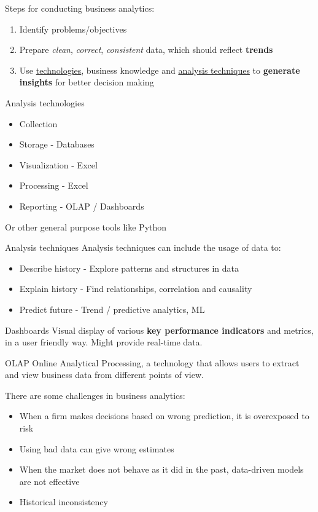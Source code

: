 Steps for conducting business analytics:
\begin{enumerate}
    \item Identify problems/objectives
    \item Prepare \textit{clean}, \textit{correct}, \textit{consistent} data, which should reflect \textbf{trends}
    \item Use \hyperref[analysis:technology]{technologies}, business knowledge and \hyperref[analysis:technique]{analysis techniques} to \textbf{generate insights} for better decision making
\end{enumerate}

\begin{theorem}
    {Analysis technologies}
    \begin{itemize}
        \item Collection
        \item Storage - Databases
        \item Visualization - Excel
        \item Processing - Excel
        \item Reporting - OLAP / Dashboards
    \end{itemize}
    Or other general purpose tools like Python
\end{theorem}
\label{analysis:technology}

\begin{theorem}
    {Analysis techniques}
    Analysis techniques can include the usage of data to:
    \begin{itemize}
        \item Describe history - Explore patterns and structures in data
        \item Explain history - Find relationships, correlation and causality
        \item Predict future - Trend / predictive analytics, ML
    \end{itemize}
\end{theorem}
\label{analysis:technique}

\begin{knBox}
    {Dashboards}
    Visual display of various \textbf{key performance indicators} and metrics, in a user friendly way. Might provide real-time data.
\end{knBox}

\begin{knBox}
    {OLAP}
    Online Analytical Processing, a technology that allows users to extract and view business data from different points of view.
\end{knBox}

There are some challenges in business analytics:

\begin{itemize}
    \item When a firm makes decisions based on wrong prediction, it is overexposed to risk
    \item Using bad data can give wrong estimates
    \item When the market does not behave as it did in the past, data-driven models are not effective
    \item Historical inconsistency
\end{itemize}
